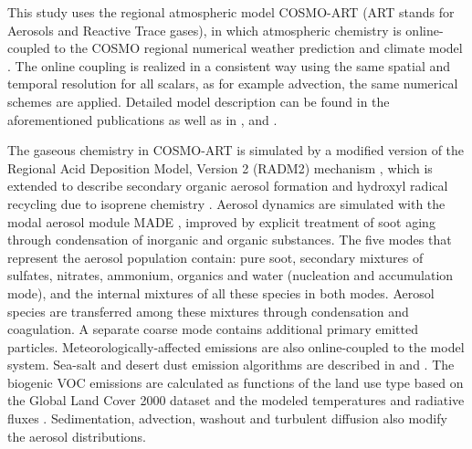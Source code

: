 This   study   uses   the   regional   atmospheric   model   COSMO-ART
\citep{Vogel-2009} (ART stands for Aerosols and Reactive Trace gases),
in which atmospheric chemistry is online-coupled to the COSMO regional
numerical      weather      prediction      and     climate      model
\citep{Baldauf-2011}. The online coupling  is realized in a consistent
way using the same spatial and temporal resolution for all scalars, as
for    example   advection,   the    same   numerical    schemes   are
applied. Detailed model description can be found in the aforementioned
publications as well as in \citep{Stanelle-2010}, \citep{Bangert-2012}
and \citep{Knote-2011}.

The gaseous chemistry in COSMO-ART  is simulated by a modified version
of  the Regional Acid  Deposition Model,  Version 2  (RADM2) mechanism
\citep{Stockwell-1990},  which  is   extended  to  describe  secondary
organic  aerosol formation  \citep{Schell-2001}  and hydroxyl  radical
recycling  due  to  isoprene chemistry  \citep{Geiger-2003}.   Aerosol
dynamics   are  simulated   with   the  modal   aerosol  module   MADE
\citep{Ackermann-1998}, improved  by explicit treatment  of soot aging
through  condensation  of  inorganic \citep{Riemer-2003}  and  organic
substances.   The five  modes  that represent  the aerosol  population
contain:  pure   soot,  secondary  mixtures   of  sulfates,  nitrates,
ammonium, organics  and water (nucleation and  accumulation mode), and
the  internal mixtures  of all  these species  in both  modes. Aerosol
species are transferred among  these mixtures through condensation and
coagulation.   A  separate  coarse  mode contains  additional  primary
emitted  particles.    Meteorologically-affected  emissions  are  also
online-coupled to the model  system. Sea-salt and desert dust emission
algorithms are described in \citep{Vogel-2006} and \citep{Vogel-2009}.
The biogenic VOC emissions are calculated as functions of the land use
type    based    on   the    Global    Land    Cover   2000    dataset
\citep{Bartholome-2005}  and the  modeled  temperatures and  radiative
fluxes  \citep{Vogel-1995}.   Sedimentation,  advection,  washout  and
turbulent diffusion also modify the aerosol distributions.

